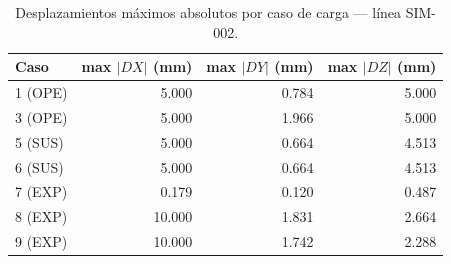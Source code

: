 \begin{table}[htbp]
  \centering
  \small
  \caption{Desplazamientos máximos absolutos por caso de carga — línea SIM-002.}
  \label{tab:desplaz-max}
  \begin{tabular}{lrrr}
    \toprule
    Caso & max $|DX|$ (\si{mm}) & max $|DY|$ (\si{mm}) & max $|DZ|$ (\si{mm}) \\
    \midrule
    1 (OPE) & 5.000 & 0.784 & 5.000 \\
    3 (OPE) & 5.000 & 1.966 & 5.000 \\
    5 (SUS) & 5.000 & 0.664 & 4.513 \\
    6 (SUS) & 5.000 & 0.664 & 4.513 \\
    7 (EXP) & 0.179 & 0.120 & 0.487 \\
    8 (EXP) & 10.000 & 1.831 & 2.664 \\
    9 (EXP) & 10.000 & 1.742 & 2.288 \\
    \bottomrule
  \end{tabular}
\end{table}
